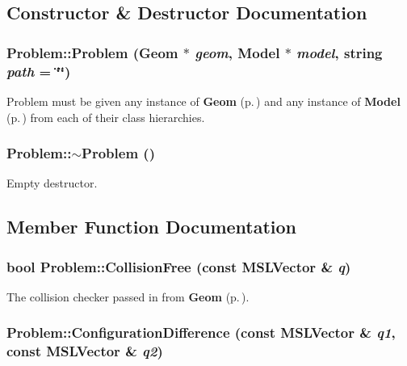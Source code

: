\subsection{Constructor \& Destructor Documentation}
\subsubsection{\setlength{\rightskip}{0pt plus 5cm}Problem::Problem ({\bf Geom} $\ast$ {\em geom}, {\bf Model} $\ast$ {\em model}, string {\em path} = \char`\"{}\char`\"{})}\label{classProblem_a0}


Problem must be given any instance of {\bf Geom} {\rm (p.\,\pageref{classGeom})} and any instance of {\bf Model} {\rm (p.\,\pageref{classModel})} from each of their class hierarchies.

\subsubsection{\setlength{\rightskip}{0pt plus 5cm}Problem::$\sim$Problem ()\hspace{0.3cm}{\tt  [inline, virtual]}}\label{classProblem_a1}


Empty destructor.



\subsection{Member Function Documentation}
\subsubsection{\setlength{\rightskip}{0pt plus 5cm}bool Problem::Collision\-Free (const {\bf MSLVector} \& {\em q})\hspace{0.3cm}{\tt  [virtual]}}\label{classProblem_a12}


The collision checker passed in from {\bf Geom} {\rm (p.\,\pageref{classGeom})}.

\subsubsection{ Problem::Configuration\-Difference (const {\bf MSLVector} \& {\em q1}, const {\bf MSLVector} \& {\em q2})\hspace{0.3cm}{\tt  [virtual]}}\label{classProblem_a14}


